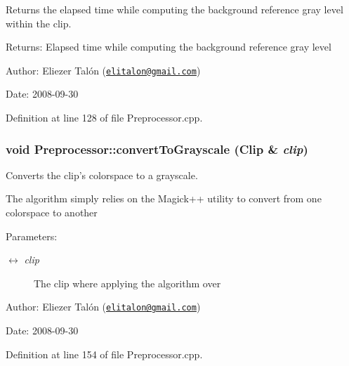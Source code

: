 Returns the elapsed time while computing the background reference gray level within the clip. 

\begin{Desc}
\item[Returns:]Elapsed time while computing the background reference gray level\end{Desc}
\begin{Desc}
\item[Author:]Eliezer Talón (\href{mailto:elitalon@gmail.com}{\tt elitalon@gmail.com}) \end{Desc}
\begin{Desc}
\item[Date:]2008-09-30 \end{Desc}


Definition at line 128 of file Preprocessor.cpp.\hypertarget{class_preprocessor_c9a0935f5eac55d15aa632fcce9b478e}{
\subsubsection[convertToGrayscale]{\setlength{\rightskip}{0pt plus 5cm}void Preprocessor::convertToGrayscale ({\bf Clip} \& {\em clip})}}
\label{class_preprocessor_c9a0935f5eac55d15aa632fcce9b478e}


Converts the clip's colorspace to a grayscale. 

The algorithm simply relies on the Magick++ utility to convert from one colorspace to another

\begin{Desc}
\item[Parameters:]
\begin{description}
\item[\mbox{$\leftrightarrow$} {\em clip}]The clip where applying the algorithm over\end{description}
\end{Desc}
\begin{Desc}
\item[Author:]Eliezer Talón (\href{mailto:elitalon@gmail.com}{\tt elitalon@gmail.com}) \end{Desc}
\begin{Desc}
\item[Date:]2008-09-30 \end{Desc}


Definition at line 154 of file Preprocessor.cpp.

